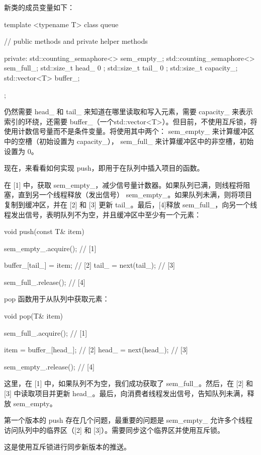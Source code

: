 新类的成员变量如下：

\begin{cpp}
template <typename T>
class queue {
// public methods and private helper methods

private:
    std::counting_semaphore<> sem_empty_;
    std::counting_semaphore<> sem_full_;
    std::size_t head_{ 0 };
    std::size_t tail_{ 0 };
    std::size_t capacity_;
    std::vector<T> buffer_;
};
\end{cpp}

仍然需要 head\_ 和 tail\_ 来知道在哪里读取和写入元素，需要 capacity\_ 来表示索引的环绕，还需要 buffer\_（一个std::vector<T>）。但目前，不使用互斥锁，将使用计数信号量而不是条件变量。将使用其中两个： sem\_empty\_ 来计算缓冲区中的空槽（初始设置为 capacity\_）， sem\_full\_ 来计算缓冲区中的非空槽，初始设置为 0。

现在，来看看如何实现 push，即用于在队列中插入项目的函数。

在 [1] 中，获取 sem\_empty\_，减少信号量计数器。如果队列已满，则线程将阻塞，直到另一个线程释放（发出信号） sem\_empty\_。如果队列未满，则将项目复制到缓冲区，并在 [2] 和 [3] 更新 tail\_。最后，[4]释放 sem\_full\_，向另一个线程发出信号，表明队列不为空，并且缓冲区中至少有一个元素：

\begin{cpp}
void push(const T& item) {
    sem_empty_.acquire(); // [1]

    buffer_[tail_] = item; // [2]
    tail_ = next(tail_); // [3]

    sem_full_.release(); // [4]
}
\end{cpp}

pop 函数用于从队列中获取元素：

\begin{cpp}
void pop(T& item) {
    sem_full_.acquire(); // [1]

    item = buffer_[head_]; // [2]
    head_ = next(head_); // [3]

    sem_empty_.release(); // [4]
}
\end{cpp}

这里，在 [1] 中，如果队列不为空，我们成功获取了 sem\_full\_。然后，在 [2] 和 [3] 中读取项目并更新 head\_。最后，向消费者线程发出信号，告知队列未满，释放 sem\_empty。

第一个版本的 push 存在几个问题，最重要的问题是 sem\_empty\_ 允许多个线程访问队列中的临界区（[2] 和 [3]）。需要同步这个临界区并使用互斥锁。

这是使用互斥锁进行同步新版本的推送。

